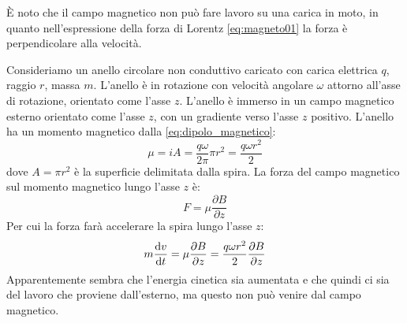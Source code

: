 \begin{Es}
  È noto che il campo magnetico non può fare lavoro su una carica in moto, in quanto nell'espressione della forza di Lorentz \eqref{eq:magneto01} la forza è perpendicolare alla velocità.

  Consideriamo un anello circolare non conduttivo caricato con carica elettrica $q$, raggio $r$, massa $m$. L'anello è in rotazione con velocità angolare $\omega$ attorno all'asse di rotazione, orientato come l'asse $z$. L'anello è immerso in un campo magnetico esterno orientato come l'asse $z$, con un gradiente verso l'asse $z$ positivo. L'anello ha un momento magnetico dalla \eqref{eq:dipolo_magnetico}:
  \begin{equation}
    \mu = iA = \frac{q\omega}{2\pi} \pi r^2 = \frac{q\omega r^2}{2}
  \end{equation}
  dove $A=\pi r^2$ è la superficie delimitata dalla spira. La forza del campo magnetico sul momento magnetico lungo l'asse $z$ è:
  \begin{equation}
    F = \mu\frac{\partial B}{\partial z}
  \end{equation}
  Per cui la forza farà accelerare la spira lungo l'asse $z$:
  \begin{equation}
    m\frac{\mathrm{d} v}{\mathrm{d} t} = \mu\frac{\partial B}{\partial z} = \frac{q\omega r^2}{2}\frac{\partial B}{\partial z}
    \label{eq:sg1}
  \end{equation}
  Apparentemente sembra che l'energia cinetica sia aumentata e che quindi ci sia del lavoro che proviene dall'esterno, ma questo non può venire dal campo magnetico.


\end{Es}
